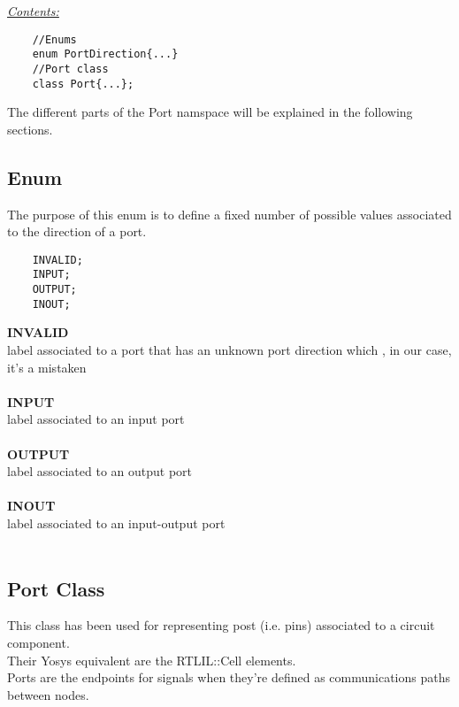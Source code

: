 \documentclass{article}
\begin{document}
\underline{\textit{\underline{Contents: }}}\\

\begin{mdframed}[hidealllines=true, backgroundcolor=green!10]
	\begin{lstlisting}
	//Enums
	enum PortDirection{...}
	//Port class
	class Port{...};
	\end{lstlisting}
\end{mdframed}

The different parts of the Port namspace will be explained in the following sections.\\

\subsection{Enum}

The purpose of this enum is to define a fixed number of possible values associated to the direction of a port.\\

\begin{mdframed}[hidealllines=true, backgroundcolor=gray!10]
	\begin{lstlisting}
	INVALID;
	INPUT;
	OUTPUT;
	INOUT;
	\end{lstlisting}
\end{mdframed}

\textbf{INVALID}\\
label associated to a port that has an unknown port direction which , in our case, it's a mistaken\\\\
\textbf{INPUT}\\
label associated to an input port\\\\
\textbf{OUTPUT}\\
label associated to an output port\\\\
\textbf{INOUT}\\
label associated to an input-output port\\\\

\subsection{Port Class}

This class has been used for representing post (i.e. pins) associated to a circuit component.\\
Their Yosys equivalent are the RTLIL::Cell elements.\\
Ports are the endpoints for signals when they're defined as communications paths between nodes.\\
\end{document}
